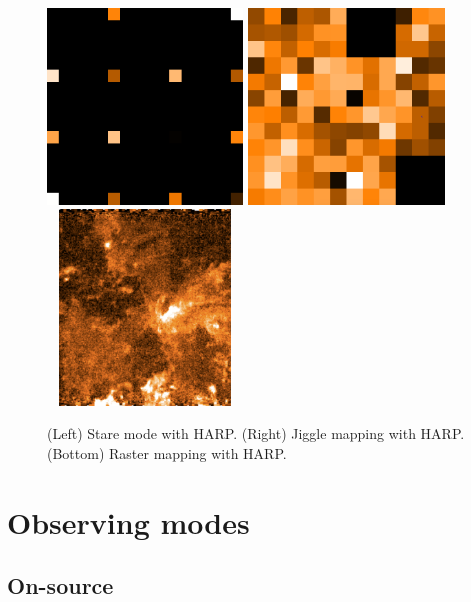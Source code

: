 \documentclass[11pt,oneside,chapters]{starlink}
\begin{document}
\begin{figure}[t!]
\begin{center}
\includegraphics[width=5.2cm, height=5.2cm]{sc20_stare}
\includegraphics[width=5.2cm, height=5.2cm]{sc20_jiggle_2021}
\includegraphics[width=5.2cm, height=5.2cm]{sc20_raster}
\caption[Stare, jiggle and raster observing modes]{\label{fig:harpmodes}
  (Left) Stare mode with HARP. (Right) Jiggle mapping with HARP.
  (Bottom) Raster mapping with HARP.}
\end{center}
\end{figure}


\section{Observing modes}
\label{sec:obsmodes}

\subsection{On-source}
\end{document}

